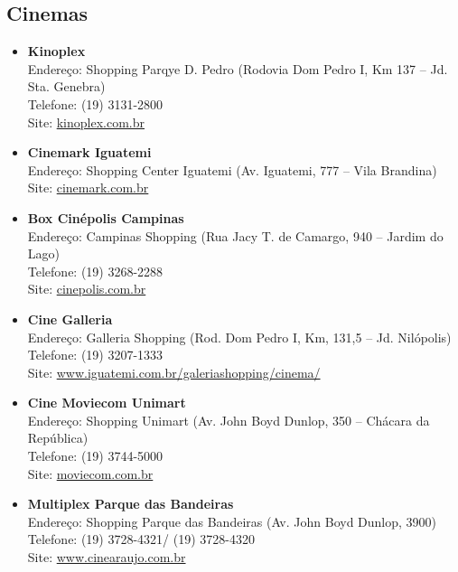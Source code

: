 \subsection{Cinemas}

\begin{itemize}
    \item   \textbf{Kinoplex}
        \\Endereço: Shopping Parqye D. Pedro (Rodovia Dom Pedro I, Km 137 --
        Jd. Sta. Genebra)
        \\Telefone: (19) 3131-2800
        \\Site: \url{kinoplex.com.br}

    \item   \textbf{Cinemark Iguatemi}
        \\Endereço: Shopping Center Iguatemi (Av. Iguatemi, 777 -- Vila
        Brandina)
        \\Site: \url{cinemark.com.br}

    \item   \textbf{Box Cinépolis Campinas}
        \\Endereço: Campinas Shopping (Rua Jacy T. de Camargo, 940 -- Jardim do
        Lago)
        \\Telefone: (19) 3268-2288
        \\Site: \url{cinepolis.com.br}

    \item   \textbf{Cine Galleria}
        \\Endereço: Galleria Shopping (Rod. Dom Pedro I, Km, 131,5 -- Jd.
        Nilópolis)
        \\Telefone: (19) 3207-1333
        \\Site: \url{www.iguatemi.com.br/galeriashopping/cinema/}

    \item   \textbf{Cine Moviecom Unimart}
        \\Endereço: Shopping Unimart (Av. John Boyd Dunlop, 350 -- Chácara da
        República)
        \\Telefone: (19) 3744-5000
        \\Site: \url{moviecom.com.br}

    \item   \textbf{Multiplex Parque das Bandeiras}
        \\Endereço: Shopping Parque das Bandeiras (Av. John Boyd Dunlop, 3900)
        \\Telefone: (19) 3728-4321/ (19) 3728-4320
        \\Site: \url{www.cinearaujo.com.br}


\end{itemize}
